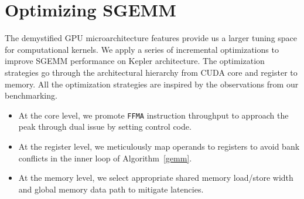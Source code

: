 \section{Optimizing SGEMM}
\label{sec:optimization}


The demystified GPU microarchitecture features provide us a larger tuning space for computational kernels.
We apply
a series of incremental optimizations to improve SGEMM performance on Kepler architecture. The optimization strategies
go through the architectural hierarchy from CUDA core and register to memory. All the optimization strategies are
inspired by the observations from our benchmarking.
\begin{itemize}
\item At the core level, we promote {\tt FFMA} instruction throughput to approach the peak through dual issue by setting control code.
\item At the register level, we meticulously map operands to registers to avoid bank conflicts in the inner loop of Algorithm~\ref{gemm}.
\item At the memory level, we select appropriate shared memory load/store width and global memory data path to mitigate
latencies.
\end{itemize}




